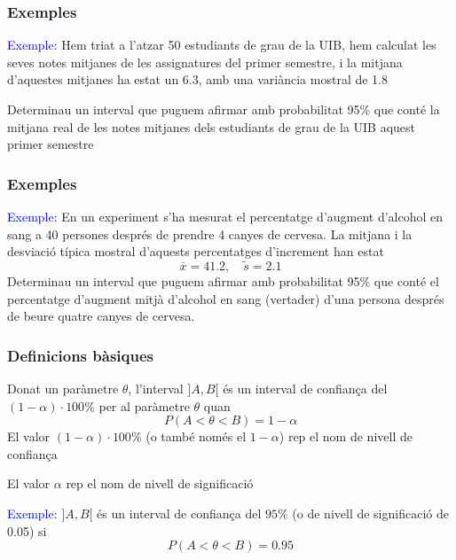 \documentclass[12pt,t]{beamer}
\newcommand{\blue}[1]{\textcolor{blue}{#1}}
\renewcommand{\emph}[1]{{\color{red}#1}}
\theoremstyle{plain}
\theoremstyle{definition}
\begin{document}
\begin{frame}
\frametitle{Exemples}


\blue{Exemple:} 
Hem triat a l'atzar 50 estudiants de grau de la UIB, hem calculat les seves notes mitjanes de les assignatures del primer semestre, i la mitjana d'aquestes mitjanes ha estat un 6.3, amb una variància mostral  de 1.8\medskip

Determinau un interval que puguem afirmar amb probabilitat 95\% que conté la mitjana real de les notes mitjanes dels estudiants de grau de la UIB aquest primer semestre
\end{frame}


\begin{frame}
\frametitle{Exemples}


\blue{Exemple:} En un experiment s'ha mesurat el percentatge d'augment d'alcohol en sang a 40 persones després de prendre 4 canyes de cervesa. La mitjana i la desviació típica mostral d'aquests percentatges d'increment han estat
$$
\overline{x}=41.2,\quad \widetilde{s}=2.1
$$
Determinau un interval que puguem afirmar amb probabilitat 95\% que conté el percentatge d'augment mitjà d'alcohol en sang  (vertader) d'una persona després de beure quatre canyes de cervesa.


\end{frame}




\begin{frame}
\frametitle{Definicions bàsiques}

Donat un paràmetre $\theta$, l'interval $]A,B[$ és un \emph{interval de confiança} del
$(1-\alpha)\cdot 100\% $ per al paràmetre $\theta$ quan
$$
P(A<\theta<B)=1-\alpha
$$
El valor $(1-\alpha)\cdot 100\% $ (o també només el $1-\alpha$) rep el nom de \emph{nivell de confiança} 
\medskip

El valor $\alpha$ rep el nom de \emph{nivell de significació}
\medskip 


\blue{Exemple:} $]A,B[$ és un interval de confiança del $95\%$ (o de nivell de significació de 0.05) si
$$
P(A<\theta<B)=0.95
$$


\end{frame}
\end{document}

